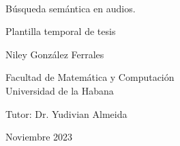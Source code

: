 \documentclass[11pt,a4paper,oldfontcommands]{memoir}
\begin{document}
%
%
\thispagestyle{empty}

{%
\sffamily
\centering
\Large

~\vspace{\fill}

{\huge 
Búsqueda semántica en audios.
}

{\LARGE
Plantilla temporal de tesis
}

\vspace{2.5cm}

{\LARGE
Niley González Ferrales
}

\vspace{3.5cm}

Facultad de Matemática y Computación\\
Universidad de la Habana
\vspace{3.5cm}

Tutor: Dr. Yudivian Almeida

\vspace{\fill}

Noviembre 2023


}%

% 
\end{document}
